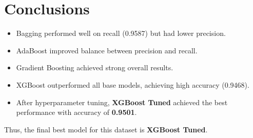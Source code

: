 \documentclass[12pt]{article}
\begin{document}
\section{Conclusions}
\begin{itemize}
    \item Bagging performed well on recall (0.9587) but had lower precision.
    \item AdaBoost improved balance between precision and recall.
    \item Gradient Boosting achieved strong overall results.
    \item XGBoost outperformed all base models, achieving high accuracy (0.9468).
    \item After hyperparameter tuning, \textbf{XGBoost Tuned} achieved the best performance with accuracy of \textbf{0.9501}.
\end{itemize}

Thus, the final best model for this dataset is \textbf{XGBoost Tuned}.
\end{document}
